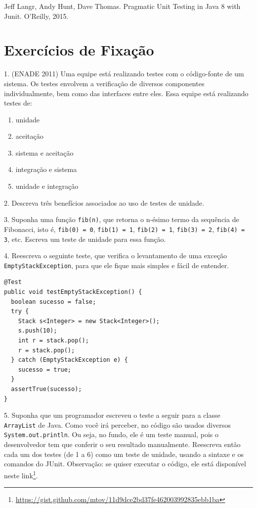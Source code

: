 \documentclass[
  11pt,
  twoside]{book}
\newcommand{\passthrough}[1]{#1}
\DeclareRobustCommand{\href}[2]{#2\footnote{\url{#1}}}
\providecommand{\tightlist}{%
  \setlength{\itemsep}{0pt}\setlength{\parskip}{0pt}}
\begin{document}
Jeff Langr, Andy Hunt, Dave Thomas. Pragmatic Unit Testing in Java 8
with Junit. O'Reilly, 2015.

\hypertarget{exercuxedcios-de-fixauxe7uxe3o-7}{%
\section*{Exercícios de
Fixação}\label{exercuxedcios-de-fixauxe7uxe3o-7}}

1. (ENADE 2011) Uma equipe está realizando testes com o código-fonte de
um sistema. Os testes envolvem a verificação de diversos componentes
individualmente, bem como das interfaces entre eles. Essa equipe está
realizando testes de:

\begin{enumerate}
\def\labelenumi{(\alph{enumi})}
\tightlist
\item
  unidade
\item
  aceitação
\item
  sistema e aceitação
\item
  integração e sistema
\item
  unidade e integração
\end{enumerate}

2. Descreva três benefícios associados ao uso de testes de unidade.

3. Suponha uma função \passthrough{\lstinline!fib(n)!}, que retorna o
n-ésimo termo da sequência de Fibonacci, isto é,
\passthrough{\lstinline!fib(0) = 0!},
\passthrough{\lstinline!fib(1) = 1!},
\passthrough{\lstinline!fib(2) = 1!},
\passthrough{\lstinline!fib(3) = 2!},
\passthrough{\lstinline!fib(4) = 3!}, etc. Escreva um teste de unidade
para essa função.

4. Reescreva o seguinte teste, que verifica o levantamento de uma
exceção \passthrough{\lstinline!EmptyStackException!}, para que ele
fique mais simples e fácil de entender.

\begin{lstlisting}
@Test
public void testEmptyStackException() {
  boolean sucesso = false;
  try {
    Stack s<Integer> = new Stack<Integer>();
    s.push(10);
    int r = stack.pop();
    r = stack.pop();
  } catch (EmptyStackException e) {
    sucesso = true;
  }
  assertTrue(sucesso);
}
\end{lstlisting}

5. Suponha que um programador escreveu o teste a seguir para a classe
\passthrough{\lstinline!ArrayList!} de Java. Como você irá perceber, no
código são usados diversos \passthrough{\lstinline!System.out.println!}.
Ou seja, no fundo, ele é um teste manual, pois o desenvolvedor tem que
conferir o seu resultado manualmente. Reescreva então cada um dos testes
(de 1 a 6) como um teste de unidade, usando a sintaxe e os comandos do
JUnit. Observação: se quiser executar o código, ele está disponível
neste
\href{https://gist.github.com/mtov/11d9dce2bd37fe462003992835ebb1ba}{link}.
\end{document}
